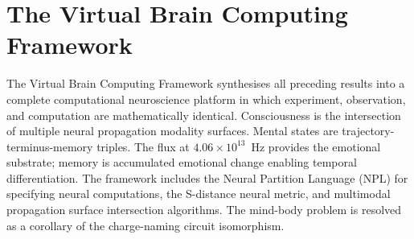 \chapter{The Virtual Brain Computing Framework}
\label{ch:virtual_brain}


\begin{chapterabstract}
The Virtual Brain Computing Framework synthesises all preceding results into a complete computational neuroscience platform in which experiment, observation, and computation are mathematically identical. Consciousness is the intersection of multiple neural propagation modality surfaces. Mental states are trajectory-terminus-memory triples. The \Hplus flux at $4.06 \times 10^{13}$~Hz provides the emotional substrate; memory is accumulated emotional change enabling temporal differentiation. The framework includes the Neural Partition Language (NPL) for specifying neural computations, the S-distance neural metric, and multimodal propagation surface intersection algorithms. The mind-body problem is resolved as a corollary of the charge-naming circuit isomorphism.
\end{chapterabstract}






